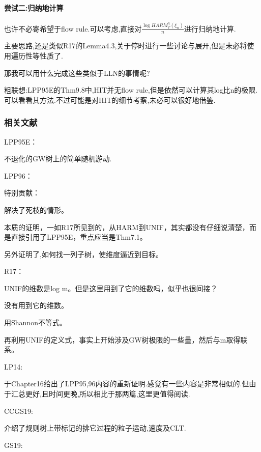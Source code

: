 \documentclass[a4paper,oneside]{ctexbook}
\begin{document}
			\paragraph*{尝试二:归纳地计算}
			\quad %

				也许不必寄希望于flow rule.可以考虑,直接对$\displaystyle\frac{\log HARM^{\eta}_T(\xi_n)}{n}$进行归纳地计算.

				主要思路,还是类似R17的Lemma4.3,关于停时进行一些讨论与展开,但是未必将使用遍历性等性质了.

				那我可以用什么完成这些类似于LLN的事情呢?

				粗联想:LPP95E的Thm9.8中,HIT并无flow rule,但是依然可以计算其log比n的极限.可以看看其方法.不过可能是对HIT的细节考察,未必可以很好地借鉴.

	
			\subsubsection*{相关文献}

				\qquad LPP95E\cite{LPP95E}：

					不退化的GW树上的简单随机游动.

				\qquad LPP96\cite{LPP96B}：

					特别贡献：

					解决了死枝的情形。

					本质的证明，一如R17所见到的，从HARM到UNIF，其实都没有仔细说清楚，而是直接引用了LPP95E，重点应当是Thm7.1。

					另外证明了,如何找一列子树，使维度逼近到目标。

				\qquad R17\cite{R17}：
					
					UNIF的维数是log m。但是这里用到了它的维数吗，似乎也很间接？

					没有用到它的维数。

					用Shannon不等式。

					再利用UNIF的定义式，事实上开始涉及GW树极限的一些量，然后与m取得联系。

				\qquad LP14\cite{LP14}:

					于Chapter16给出了LPP95,96内容的重新证明.感觉有一些内容是非常相似的.但由于汇总更好,且时间更晚,所以相比于那两篇,这里更值得阅读.

				\qquad CCGS19\cite{CCGS19}:

					介绍了规则树上带标记的排它过程的粒子运动,速度及CLT.

				\qquad GS19\cite{GS19}:
\end{document}
